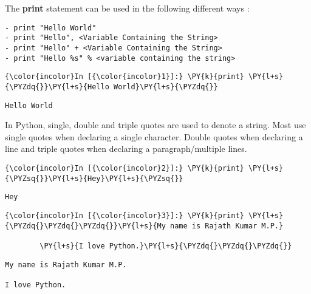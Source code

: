     The \textbf{print} statement can be used in the following different ways
:

\begin{verbatim}
- print "Hello World"
- print "Hello", <Variable Containing the String>
- print "Hello" + <Variable Containing the String>
- print "Hello %s" % <variable containing the string>
\end{verbatim}

    \begin{Verbatim}[commandchars=\\\{\}]
{\color{incolor}In [{\color{incolor}1}]:} \PY{k}{print} \PY{l+s}{\PYZdq{}}\PY{l+s}{Hello World}\PY{l+s}{\PYZdq{}}
\end{Verbatim}

    \begin{Verbatim}[commandchars=\\\{\}]
Hello World
    \end{Verbatim}

    In Python, single, double and triple quotes are used to denote a string.
Most use single quotes when declaring a single character. Double quotes
when declaring a line and triple quotes when declaring a
paragraph/multiple lines.

    \begin{Verbatim}[commandchars=\\\{\}]
{\color{incolor}In [{\color{incolor}2}]:} \PY{k}{print} \PY{l+s}{\PYZsq{}}\PY{l+s}{Hey}\PY{l+s}{\PYZsq{}}
\end{Verbatim}

    \begin{Verbatim}[commandchars=\\\{\}]
Hey
    \end{Verbatim}

    \begin{Verbatim}[commandchars=\\\{\}]
{\color{incolor}In [{\color{incolor}3}]:} \PY{k}{print} \PY{l+s}{\PYZdq{}\PYZdq{}\PYZdq{}}\PY{l+s}{My name is Rajath Kumar M.P.}
        
        \PY{l+s}{I love Python.}\PY{l+s}{\PYZdq{}\PYZdq{}\PYZdq{}}
\end{Verbatim}

    \begin{Verbatim}[commandchars=\\\{\}]
My name is Rajath Kumar M.P.

I love Python.
    \end{Verbatim}

